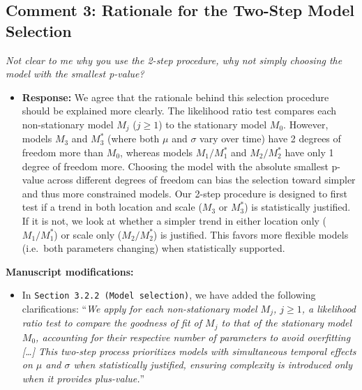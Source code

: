 \documentclass[
  letterpaper,
  DIV=11,
  numbers=noendperiod]{scrartcl}
\providecommand{\tightlist}{%
  \setlength{\itemsep}{0pt}\setlength{\parskip}{0pt}}\usepackage{longtable,booktabs,array}
\begin{document}
\subsection{Comment 3: Rationale for the Two-Step Model
Selection}\label{comment-3-rationale-for-the-two-step-model-selection}

\emph{Not clear to me why you use the 2-step procedure, why not simply
choosing the model with the smallest p-value?}

\begin{itemize}
\tightlist
\item
  \textbf{Response:} We agree that the rationale behind this selection
  procedure should be explained more clearly. The likelihood ratio test
  compares each non-stationary model \(M_{j}\) (\(j\geq 1\)) to the
  stationary model \(M_{0}\). However, models \(M_{3}\) and
  \(M_{3}^{*}\) (where both \(\mu\) and \(\sigma\) vary over time) have
  2 degrees of freedom more than \(M_{0}\), whereas models
  \(M_{1}/M_{1}^{*}\) and \(M_{2}/M_{2}^{*}\) have only 1 degree of
  freedom more. Choosing the model with the absolute smallest p-value
  across different degrees of freedom can bias the selection toward
  simpler and thus more constrained models. Our 2-step procedure is
  designed to first test if a trend in both location and scale
  (\(M_{3}\) or \(M_{3}^{*}\)) is statistically justified. If it is not,
  we look at whether a simpler trend in either location only
  (\(M_{1}/M_{1}^{*}\)) or scale only (\(M_{2}/M_{2}^{*}\)) is
  justified. This favors more flexible models (i.e.~both parameters
  changing) when statistically supported.
\end{itemize}

\textbf{Manuscript modifications:}

\begin{itemize}
\tightlist
\item
  In \texttt{Section\ 3.2.2\ (Model\ selection)}, we have added the
  following clarifications: ``\emph{We apply for each non-stationary
  model \(M_{j}\), \(j \ge 1\), a likelihood ratio test to compare the
  goodness of fit of \(M_{j}\) to that of the stationary model
  \(M_{0}\), accounting for their respective number of parameters to
  avoid overfitting {[}\ldots{]} This two-step process prioritizes
  models with simultaneous temporal effects on \(\mu\) and \(\sigma\)
  when statistically justified, ensuring complexity is introduced only
  when it provides plus-value.}''
\end{itemize}
\end{document}
